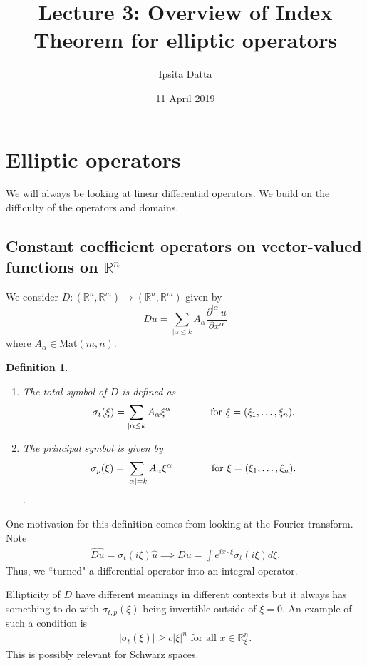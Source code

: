 \documentclass[11pt]{article}
\title{Lecture 3: Overview of Index Theorem for elliptic operators}
\author{Ipsita Datta}
\date{11 April 2019}
\newcommand{\R}{\mathbb{R}}
\newcommand{\Mat}{\mathrm{Mat}}
\newtheorem{defn}[thm]{Definition}
\begin{document}
\maketitle 

\section*{Elliptic operators}
We will always be looking at linear differential operators. We build on the difficulty of the operators and domains.

\subsection*{Constant coefficient operators on vector-valued functions on $\R^n$}
We consider $D: (\R^n, \R^m) \to (\R^n, \R^m) $ given by
$$Du = \sum\limits_{|\alpha \leq k} A_\alpha \frac{\partial^{|\alpha|} u }{\partial x^\alpha}$$ where $A_\alpha \in \Mat (m,n)$.

 \begin{defn} 
 \begin{enumerate}
 \item[a.]
 The {\it total symbol} of $D$ is defined as $$\sigma_t(\xi) = \sum\limits_{|\alpha \leq k} A_\alpha \xi^\alpha \hspace{0.5in} \mbox{   for $\xi = (\xi_1, \dots, \xi_n)$.} $$ %
 \item[b.]
 The principal symbol is given by $$\sigma_p (\xi) = \sum_{|\alpha| = k} A_\alpha \xi^\alpha \hspace{0.5in} \mbox{   for $\xi = (\xi_1, \dots, \xi_n)$.}$$.
 \end{enumerate}
\end{defn}

One motivation for this definition comes from looking at the Fourier transform.
Note 
\begin{align*}
\widehat{Du} = \sigma_t (i \xi) \hat{u} \implies Du = \int e^{ix \cdot \xi} \sigma_t(i \xi) d\xi.
\end{align*}
Thus, we ``turned" a differential operator into an integral operator.

Ellipticity of $D$ have different meanings in different contexts but it always has something to do with $\sigma_{t,p} (\xi)$ being invertible outside of $\xi = 0$. An example of such a condition is
\begin{align*} \label{cond:star} \tag{$\star$}
|\sigma_t(\xi)| \geq c|\xi|^n \mbox{ for all $x \in \R^n_{\xi}$}.
\end{align*}
This is possibly relevant for Schwarz spaces.
\end{document}
